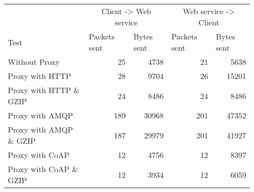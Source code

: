 \begin{tabular}{lrrrr}
\hline
\multicolumn{1}{l}{}                  & \multicolumn{2}{c}{Client -> Web service}                           & \multicolumn{2}{c}{Web service -> Client}                           \\
\multicolumn{1}{l}{Test} & \multicolumn{1}{l}{Packets sent} & \multicolumn{1}{l}{Bytes sent} & \multicolumn{1}{l}{Packets sent} & \multicolumn{1}{l}{Bytes sent} \\ \hline
Without Proxy                   & 25             & 4738           & 21             & 5638           \\
Proxy with HTTP                 & 28             & 9704           & 26             & 15201          \\
Proxy with HTTP \& GZIP         & 24             & 8486           & 24             & 8486           \\
Proxy with AMQP                 & 189            & 30968          & 201            & 47352          \\
Proxy with AMQP \& GZIP         & 187            & 29979          & 201            & 41927          \\
Proxy with CoAP                 & 12             & 4756           & 12             & 8397           \\
Proxy with CoAP \& GZIP         & 12             & 3934           & 12             & 6059           \\
\end{tabular}